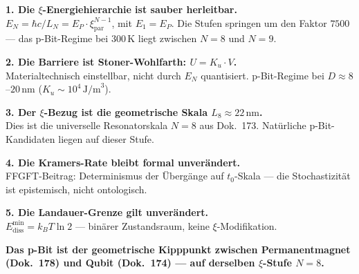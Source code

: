 	\begin{conclusionBox}
		{\small\sloppy
		\textbf{1. Die $\xi$-Energiehierarchie ist sauber herleitbar.}\\
		$E_N = \hbar c/L_N = E_P\cdot\xi_\text{par}^{N-1}$, mit $E_1 = E_P$.
		Die Stufen springen um den Faktor $7500$ --- das p-Bit-Regime bei
		300\,K liegt zwischen $N=8$ und $N=9$.
		
		\textbf{2. Die Barriere ist Stoner-Wohlfarth: $U = K_u \cdot V$.}\\
		Materialtechnisch einstellbar, nicht durch $E_N$ quantisiert.
		p-Bit-Regime bei $D \approx 8$--$20\,\text{nm}$ ($K_u \sim 10^4\,\text{J/m}^3$).
		
		\textbf{3. Der $\xi$-Bezug ist die geometrische Skala $L_8 \approx 22\,\text{nm}$.}\\
		Dies ist die universelle Resonatorskala $N=8$ aus Dok.~173.
		Natürliche p-Bit-Kandidaten liegen auf dieser Stufe.
		
		\textbf{4. Die Kramers-Rate bleibt formal unverändert.}\\
		FFGFT-Beitrag: Determinismus der Übergänge auf $t_0$-Skala ---
		die Stochastizität ist epistemisch, nicht ontologisch.
		
		\textbf{5. Die Landauer-Grenze gilt unverändert.}\\
		$E_\text{diss}^\text{min} = k_BT\ln 2$ --- binärer Zustandsraum,
		keine $\xi$-Modifikation.
		
		\vspace{0.5em}
		\textbf{Das p-Bit ist der geometrische Kipppunkt zwischen Permanentmagnet
			(Dok.~178) und Qubit (Dok.~174) --- auf derselben $\xi$-Stufe $N=8$.}
		} %
	\end{conclusionBox}
	
